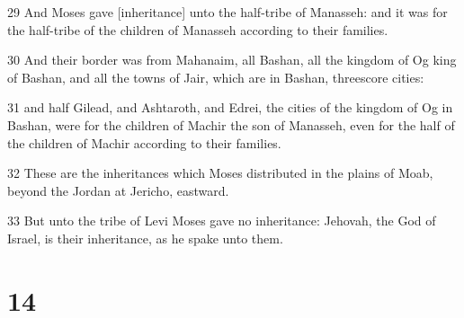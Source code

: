 \par 29 And Moses gave [inheritance] unto the half-tribe of Manasseh: and it was for the half-tribe of the children of Manasseh according to their families.
\par 30 And their border was from Mahanaim, all Bashan, all the kingdom of Og king of Bashan, and all the towns of Jair, which are in Bashan, threescore cities:
\par 31 and half Gilead, and Ashtaroth, and Edrei, the cities of the kingdom of Og in Bashan, were for the children of Machir the son of Manasseh, even for the half of the children of Machir according to their families.
\par 32 These are the inheritances which Moses distributed in the plains of Moab, beyond the Jordan at Jericho, eastward.
\par 33 But unto the tribe of Levi Moses gave no inheritance: Jehovah, the God of Israel, is their inheritance, as he spake unto them.

\chapter{14}

